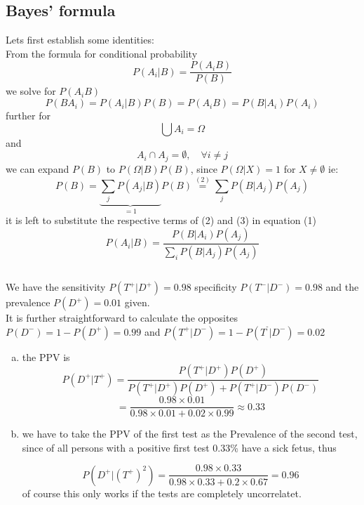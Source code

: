 \documentclass[a4paper,10pt]{article}
\begin{document}
\subsection{Bayes' formula}
\label{sub:three}
Lets first establish some identities:\\
From the formula for conditional probability
\begin{equation}
  P(A_i|B)=\frac{P(A_iB)}{P(B)}
\end{equation}
we solve for $P(A_iB)$
\begin{equation}
  P(BA_i)=P(A_i|B)P(B)=P(A_iB)=P(B|A_i)P(A_i)
\end{equation}
further for
\begin{equation*}
  \bigcup A_i=\Omega  
\end{equation*}
 and
 \begin{equation*}
 A_i\cap A_j= \emptyset,\quad \forall i\neq j  
 \end{equation*}
 we can expand $P(B)$ to $P(\Omega |B)P(B)$, since $P(\Omega |X)=1$ for $X\neq \emptyset$ ie:
\begin{equation}
  P(B)= \underbrace{  \sum_{j}P(A_j|B)}_{=1} P(B) \stackrel{(2)}{= }  \sum_{j} P(B|A_j)P(A_j)
\end{equation}
it is left to substitute the respective terms  of (2) and (3)  in equation (1) 
\begin{equation}
  P(A_i|B)= \frac{P(B|A_i)P(A_j)}{\sum_{i} P(B|A_j)P(A_j)}
\end{equation}

\subsection{}
\label{sub:sdf}
We have the sensitivity $P(T^+|D^+)=0.98$ specificity $P(T^-|D^-)=0.98$ and the prevalence $P(D^+)=0.01$ given.\\
It is further straightforward to calculate the opposites $P(D^-)=1-P(D^+)=0.99$ and $P(T^+|D^-)=1-P(T^⁻|D^-)=0.02$
\begin{enumerate}[(a)]
  \item the PPV is 
    \begin{equation}
      P(D^+|T^+)= \frac{P(T^+|D^+)P(D^+)}{P(T^+|D^+)P(D^+)+P(T^+|D^-)P(D^-)}
    \end{equation}
    \begin{equation*}
      = \frac{0.98\times 0.01}{0.98\times 0.01+ 0.02\times 0.99}\approx 0.33
    \end{equation*}
  \item we have to take the PPV of the first test as the Prevalence of the second test, since of all persons with a positive first test 0.33\% have a sick fetus, thus 

   \begin{equation*}
     P(D^+|(T^+)^2)= \frac{0.98\times 0.33 }{0.98\times 0.33 +0.2\times 0.67}=0.96
   \end{equation*}
   of course this only works if the tests are completely uncorrelatet.
\end{enumerate}
\end{document}
